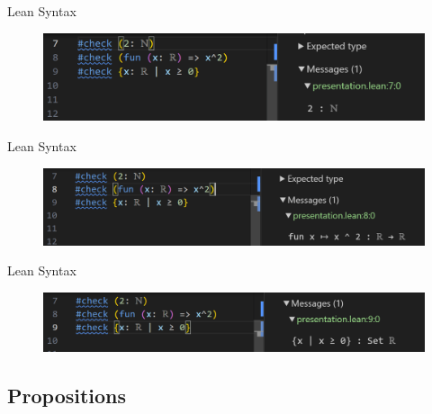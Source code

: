 \documentclass[xcolor=dvipsnames]{beamer}
\begin{document}
\begin{frame}{Lean Syntax}

\begin{figure}
    \centering
    \includegraphics[width=1\linewidth]{name1.png}
\end{figure}

\end{frame}

\begin{frame}{Lean Syntax}

\begin{figure}
    \centering
    \includegraphics[width=1\linewidth]{name2.png}
\end{figure}

\end{frame}

\begin{frame}{Lean Syntax}

\begin{figure}
    \centering
    \includegraphics[width=1\linewidth]{name3.png}
\end{figure}

\end{frame}




\subsection{Propositions}
\end{document}
